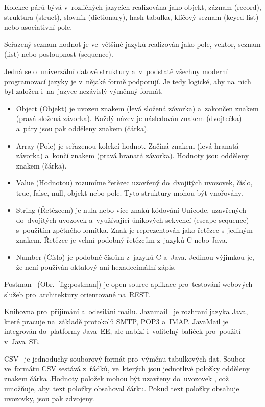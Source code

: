 Kolekce párů  bývá v~rozličných jazycích realizována jako objekt, záznam (record), struktura (struct), slovník (dictionary), hash tabulka, klíčový seznam (keyed list) nebo asociativní pole.

Seřazený seznam hodnot je ve~většině jazyků realizován jako pole, vektor, seznam (list) nebo posloupnost (sequence).

Jedná se o~univerzální datové struktury a~v~podstatě všechny moderní programovací jazyky je v~nějaké formě podporují. Je tedy logické, aby na~nich byl založen i~na~jazyce nezávislý výměnný formát.
\begin{itemize}
	\item Object (Objekt) je uvozen znakem \uv{\{} (levá složená závorka) a~zakončen znakem \uv{\}} (pravá složená závorka). Každý název je následován znakem \uv{:} (dvojtečka) a~páry  jsou pak odděleny znakem \uv{,} (čárka).
	\item Array (Pole) je seřazenou kolekcí hodnot. Začíná znakem \uv{[} (levá hranatá závorka) a~končí znakem \uv{]} (pravá hranatá závorka). Hodnoty jsou odděleny znakem \uv{,} (čárka).
	\item Value (Hodnotou) rozumíme řetězec uzavřený do~dvojitých uvozovek, číslo, true, false, null, objekt nebo pole.
	Tyto struktury mohou být vnořovány.
	\item String (Řetězcem) je nula nebo více znaků kódování Unicode, uzavřených do~dvojitých uvozovek a~využívající únikových sekvencí (escape sequence) s~použitím zpětného lomítka. Znak je reprezentován jako řetězec s~jediným znakem. Řetězec je velmi podobný řetězcům z~jazyků C nebo Java.
	\item Number (Číslo) je podobné číslům z~jazyků C a~Java. Jedinou výjimkou je, že není používán oktalový ani hexadecimální zápis.
\end{itemize}

Postman~\cite{postman} (Obr.~\ref{fig:postman}) je open source aplikace pro~testování webových služeb pro~architektury orientované na~REST.


Knihovna pro~příjímání a~odesíláni mailu. Javamail~\cite{javamail} je rozhraní jazyka Java, které pracuje na~základě protokolů SMTP, POP3 a~IMAP. JavaMail je integrován do~platformy Java~EE, ale nabízí i~volitelný balíček pro~použití v~Java~SE.

CSV~\cite{csv} je jednoduchy souborový formát pro~výměnu tabulkových dat.
Soubor ve~formátu CSV sestává z~řádků, ve~kterých jsou jednotlivé položky odděleny znakem čárka \uv{,}.Hodnoty položek mohou být uzavřeny do~uvozovek , což umožňuje, aby~text položky obsahoval čárku. Pokud text položky obsahuje uvozovky, jsou pak zdvojeny.

